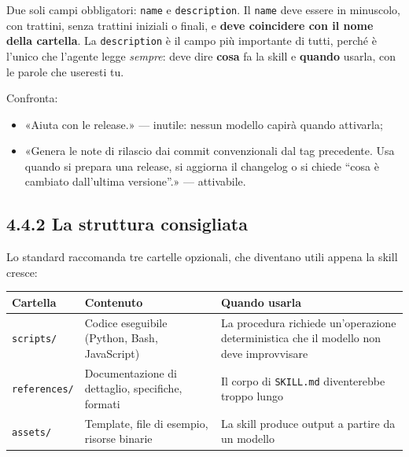\documentclass[
  italian,
  10pt,
]{book}
\newcounter{none} %
\providecommand{\tightlist}{%
  \setlength{\itemsep}{0pt}\setlength{\parskip}{0pt}}
\begin{document}
Due soli campi obbligatori: \texttt{name} e \texttt{description}. Il
\texttt{name} deve essere in minuscolo, con trattini, senza trattini
iniziali o finali, e \textbf{deve coincidere con il nome della
cartella}. La \texttt{description} è il campo più importante di tutti,
perché è l'unico che l'agente legge \emph{sempre}: deve dire
\textbf{cosa} fa la skill e \textbf{quando} usarla, con le parole che
useresti tu.

Confronta:

\begin{itemize}
\tightlist
\item
  «Aiuta con le release.» --- inutile: nessun modello capirà quando
  attivarla;
\item
  «Genera le note di rilascio dai commit convenzionali dal tag
  precedente. Usa quando si prepara una release, si aggiorna il
  changelog o si chiede ``cosa è cambiato dall'ultima versione''.» ---
  attivabile.
\end{itemize}

\subsection{4.4.2 La struttura
consigliata}\label{la-struttura-consigliata}

Lo standard raccomanda tre cartelle opzionali, che diventano utili
appena la skill cresce:

{\def\LTcaptype{none} %
\begin{longtable}[]{@{}
  >{\raggedright\arraybackslash}p{}
  >{\raggedright\arraybackslash}p{}
  >{\raggedright\arraybackslash}p{}@{}}
\toprule\noalign{}
\begin{minipage}[b]{\linewidth}\raggedright
Cartella
\end{minipage} & \begin{minipage}[b]{\linewidth}\raggedright
Contenuto
\end{minipage} & \begin{minipage}[b]{\linewidth}\raggedright
Quando usarla
\end{minipage} \\
\midrule\noalign{}
\endhead
\bottomrule\noalign{}
\endlastfoot
\texttt{scripts/} & Codice eseguibile (Python, Bash, JavaScript) & La
procedura richiede un'operazione deterministica che il modello non deve
improvvisare \\
\texttt{references/} & Documentazione di dettaglio, specifiche, formati
& Il corpo di \texttt{SKILL.md} diventerebbe troppo lungo \\
\texttt{assets/} & Template, file di esempio, risorse binarie & La skill
produce output a partire da un modello \\
\end{longtable}
}
\end{document}
